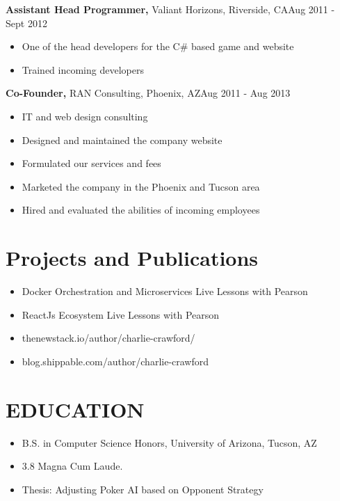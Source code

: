 \documentclass{res}
\begin{document}
\begin{resume}
  {\bf Assistant Head Programmer,} Valiant Horizons, Riverside, CA\hfill Aug 2011 - Sept 2012
  \begin{itemize} \itemsep -2pt %
    \item One of the head developers for the C\# based game and website
    \item Trained incoming developers
  \end{itemize}

  {\bf Co-Founder,} RAN Consulting, Phoenix, AZ\hfill Aug 2011 - Aug 2013
  \begin{itemize} \itemsep -2pt %
    \item IT and web design consulting
    \item Designed and maintained the company website
    \item Formulated our services and fees
    \item Marketed the company in the Phoenix and Tucson area
    \item Hired and evaluated the abilities of incoming employees
  \end{itemize}

\section{Projects and Publications}
  \begin{itemize} \itemsep -2pt %
    \item Docker Orchestration and Microservices Live Lessons with Pearson
    \item ReactJs Ecosystem Live Lessons with Pearson
    \item thenewstack.io/author/charlie-crawford/
    \item blog.shippable.com/author/charlie-crawford
  \end{itemize}

\section{EDUCATION} 
  \begin{itemize} \itemsep -2pt %
    \item B.S. in Computer Science Honors, University of Arizona, Tucson, AZ
    \item 3.8 Magna Cum Laude. 
    \item Thesis: Adjusting Poker AI based on Opponent Strategy
  \end{itemize}


\end{resume}
\end{document}
